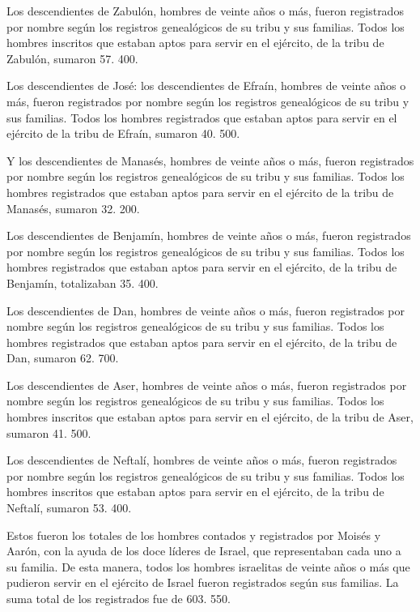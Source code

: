  Los descendientes de Zabulón, hombres de veinte años o
más, fueron registrados por nombre según los registros genealógicos de
su tribu y sus familias. Todos los hombres inscritos que estaban aptos
para servir en el ejército,  de la tribu de Zabulón,
sumaron 57. 400.

 Los descendientes de José: los descendientes de Efraín,
hombres de veinte años o más, fueron registrados por nombre según los
registros genealógicos de su tribu y sus familias. Todos los hombres
registrados que estaban aptos para servir en el ejército 
de la tribu de Efraín, sumaron 40. 500.

 Y los descendientes de Manasés, hombres de veinte años o
más, fueron registrados por nombre según los registros genealógicos de
su tribu y sus familias. Todos los hombres registrados que estaban aptos
para servir en el ejército  de la tribu de Manasés,
sumaron 32. 200.

 Los descendientes de Benjamín, hombres de veinte años o
más, fueron registrados por nombre según los registros genealógicos de
su tribu y sus familias. Todos los hombres registrados que estaban aptos
para servir en el ejército,  de la tribu de Benjamín,
totalizaban 35. 400.

 Los descendientes de Dan, hombres de veinte años o más,
fueron registrados por nombre según los registros genealógicos de su
tribu y sus familias. Todos los hombres registrados que estaban aptos
para servir en el ejército,  de la tribu de Dan, sumaron
62. 700.

 Los descendientes de Aser, hombres de veinte años o más,
fueron registrados por nombre según los registros genealógicos de su
tribu y sus familias. Todos los hombres inscritos que estaban aptos para
servir en el ejército,  de la tribu de Aser, sumaron 41.
500.

 Los descendientes de Neftalí, hombres de veinte años o
más, fueron registrados por nombre según los registros genealógicos de
su tribu y sus familias. Todos los hombres inscritos que estaban aptos
para servir en el ejército,  de la tribu de Neftalí,
sumaron 53. 400.

 Estos fueron los totales de los hombres contados y
registrados por Moisés y Aarón, con la ayuda de los doce líderes de
Israel, que representaban cada uno a su familia.  De esta
manera, todos los hombres israelitas de veinte años o más que pudieron
servir en el ejército de Israel fueron registrados según sus familias.
 La suma total de los registrados fue de 603. 550.

